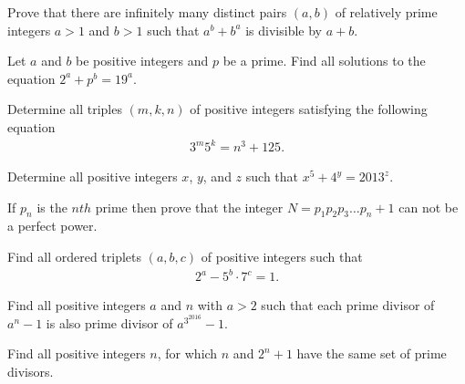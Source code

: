 \documentclass{subfile}
\begin{document}
	\begin{problem}[USAMO‌2017] %
		Prove that there are infinitely many distinct pairs $(a, b)$ of relatively prime integers $a>1$ and $b>1$ such that $a^b+b^a$ is divisible by $a+b$.
	\end{problem}

	\begin{problem} %
		Let $a$ and $b$ be positive integers and $p$ be a prime. Find all solutions to the equation $2^a+p^b=19^a$.
	\end{problem}

	\begin{problem} %
		Determine all triples $(m,k,n)$ of positive integers satisfying the following equation
			\begin{align*}
				3^m5^k=n^3+125.
			\end{align*}
	\end{problem}

	\begin{problem}[Balkan 2013] %
		Determine all positive integers $x$, $y$, and $z$ such that $x^5 + 4^y = 2013^z$.
	\end{problem}

	\begin{problem} %
		If $p_n$ is the $nth$ prime then prove that the integer $N = p_1p_2p_3 \dots p_n + 1$ can not be a perfect power.
	\end{problem}

	\begin{problem} %
		Find all ordered triplets $(a,b,c)$ of positive integers such that
			\begin{align*}
				2^a-5^{b}\cdot 7^{c} = 1.
			\end{align*}
	\end{problem}

	\begin{problem} %
		Find all positive integers $a$ and $n$ with $a>2$ such that each prime divisor of $a^n-1$ is also prime divisor of $a^{3^{2016}}-1$.
	\end{problem}

	\begin{problem} %
		Find all positive integers $n$, for which $n$ and $2^n + 1$ have the same set of prime divisors.
	\end{problem}
\end{document}
